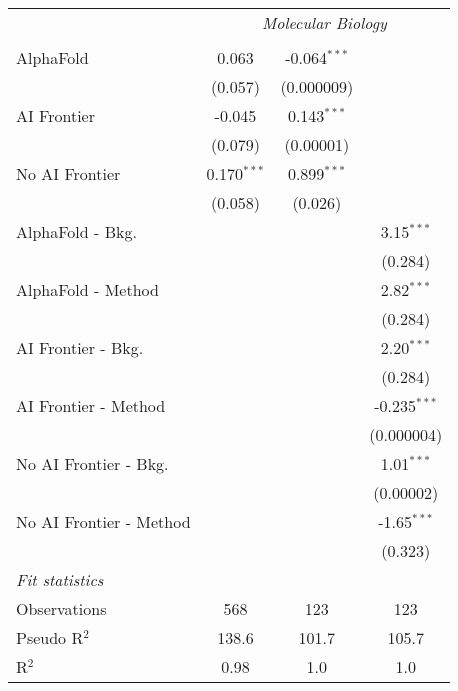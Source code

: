 \begin{tabular}{lccc}
 & \multicolumn{3}{c}{\textit{Molecular Biology}} \\ \\
   AlphaFold               & 0.063         & -0.064$^{***}$ &   \\   
                           & (0.057)       & (0.000009)     &   \\   
   AI Frontier             & -0.045        & 0.143$^{***}$  &   \\   
                           & (0.079)       & (0.00001)      &   \\   
   No AI Frontier          & 0.170$^{***}$ & 0.899$^{***}$  &   \\   
                           & (0.058)       & (0.026)        &   \\   
   AlphaFold - Bkg.        &               &                & 3.15$^{***}$\\   
                           &               &                & (0.284)\\   
   AlphaFold - Method      &               &                & 2.82$^{***}$\\   
                           &               &                & (0.284)\\   
   AI Frontier - Bkg.      &               &                & 2.20$^{***}$\\   
                           &               &                & (0.284)\\   
   AI Frontier - Method    &               &                & -0.235$^{***}$\\   
                           &               &                & (0.000004)\\   
   No AI Frontier - Bkg.   &               &                & 1.01$^{***}$\\   
                           &               &                & (0.00002)\\   
   No AI Frontier - Method &               &                & -1.65$^{***}$\\   
                           &               &                & (0.323)\\   
   \midrule
   \emph{Fit statistics}\\
   Observations            & 568           & 123            & 123\\  
   Pseudo R$^2$            & 138.6         & 101.7          & 105.7\\  
   R$^2$                   & 0.98          & 1.0            & 1.0\\  
   

\end{tabular}

